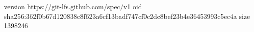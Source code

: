 version https://git-lfs.github.com/spec/v1
oid sha256:362f0b67d120838c8f623a6cf13badf747cf0c2dc8bef23b4e36453993c5ec4a
size 1398246
